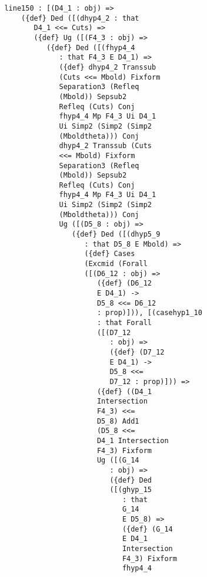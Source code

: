 \documentclass[12pt]{article}
\begin{document}
\begin{verbatim}
         line150 : [(D4_1 : obj) => 
             ({def} Ded ([(dhyp4_2 : that 
                D4_1 <<= Cuts) => 
                ({def} Ug ([(F4_3 : obj) => 
                   ({def} Ded ([(fhyp4_4 
                      : that F4_3 E D4_1) => 
                      ({def} dhyp4_2 Transsub 
                      (Cuts <<= Mbold) Fixform 
                      Separation3 (Refleq 
                      (Mbold)) Sepsub2 
                      Refleq (Cuts) Conj 
                      fhyp4_4 Mp F4_3 Ui D4_1 
                      Ui Simp2 (Simp2 (Simp2 
                      (Mboldtheta))) Conj 
                      dhyp4_2 Transsub (Cuts 
                      <<= Mbold) Fixform 
                      Separation3 (Refleq 
                      (Mbold)) Sepsub2 
                      Refleq (Cuts) Conj 
                      fhyp4_4 Mp F4_3 Ui D4_1 
                      Ui Simp2 (Simp2 (Simp2 
                      (Mboldtheta))) Conj 
                      Ug ([(D5_8 : obj) => 
                         ({def} Ded ([(dhyp5_9 
                            : that D5_8 E Mbold) => 
                            ({def} Cases 
                            (Excmid (Forall 
                            ([(D6_12 : obj) => 
                               ({def} (D6_12 
                               E D4_1) -> 
                               D5_8 <<= D6_12 
                               : prop)])), [(casehyp1_10 
                               : that Forall 
                               ([(D7_12 
                                  : obj) => 
                                  ({def} (D7_12 
                                  E D4_1) -> 
                                  D5_8 <<= 
                                  D7_12 : prop)])) => 
                               ({def} ((D4_1 
                               Intersection 
                               F4_3) <<= 
                               D5_8) Add1 
                               (D5_8 <<= 
                               D4_1 Intersection 
                               F4_3) Fixform 
                               Ug ([(G_14 
                                  : obj) => 
                                  ({def} Ded 
                                  ([(ghyp_15 
                                     : that 
                                     G_14 
                                     E D5_8) => 
                                     ({def} (G_14 
                                     E D4_1 
                                     Intersection 
                                     F4_3) Fixform 
                                     fhyp4_4 

\end{verbatim}
\end{document}
